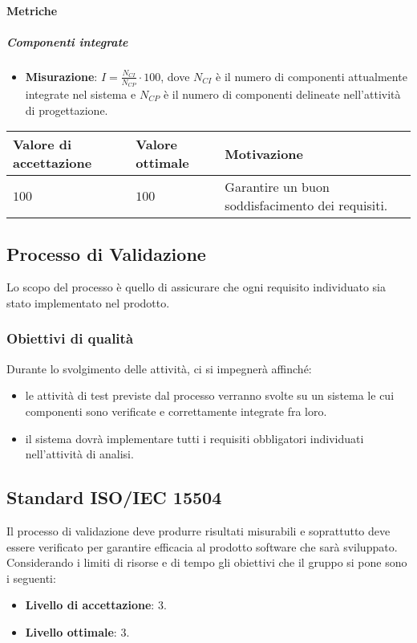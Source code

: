 \paragraph{Metriche}
\subparagraph{Componenti integrate}

\begin{itemize}
\item \textbf{Misurazione}: $I=\frac{N_{CI}}{N_{CP}} \cdot 100$, dove $N_{CI}$ è il numero di componenti attualmente integrate nel sistema e $N_{CP}$ è il numero di componenti delineate nell'attività di progettazione.
\end{itemize}

\begin{center}
		\begin{tabular}{|P{2.5cm}|P{2.5cm}|P{6cm}|}
		\hline
			\textbf{Valore di accettazione}	& \textbf{Valore ottimale} & \textbf{Motivazione} \\
			\hline
			$100$ & $100$ &	Garantire un buon soddisfacimento dei requisiti. \\
			\hline
			\end{tabular}
\end{center}

\subsection{Processo di Validazione}
Lo scopo del processo è quello di assicurare che ogni requisito individuato sia stato implementato nel prodotto.

\subsubsection{Obiettivi di qualità}
Durante lo svolgimento delle attività, ci si impegnerà affinché:
\begin{itemize}
\item le attività di test previste dal processo verranno svolte su un sistema le cui componenti sono verificate e correttamente integrate fra loro.
\item il sistema dovrà implementare tutti i requisiti obbligatori individuati nell'attività di analisi.
\end{itemize}

\subsection{Standard ISO/IEC 15504}
Il processo di validazione deve produrre risultati misurabili e soprattutto deve essere verificato per garantire efficacia al prodotto software che sarà sviluppato. Considerando i limiti di risorse e di tempo gli obiettivi che il gruppo si pone sono i seguenti:
\begin{itemize}
\item \textbf{Livello di accettazione}: 3.
\item \textbf{Livello ottimale}: 3.
\end{itemize}


